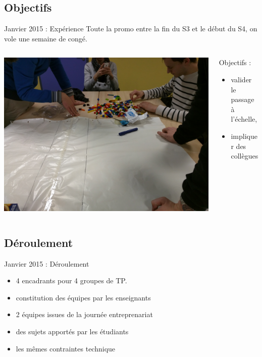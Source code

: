 \documentclass{beamer}
\begin{document}
\subsection{Objectifs}
\begin{frame}{Janvier 2015 : Expérience}
  Toute la promo entre la fin du S3 et le début du S4, on vole une semaine de congé.
  \begin{columns}
    \begin{column}{0.5\textwidth}
      \begin{center}
        \includegraphics[width=\textwidth]{includes/201501_lego.jpg}      
      \end{center}
    \end{column}
    \begin{column}{0.5\textwidth}
      Objectifs : 
      \begin{itemize}
        \item valider le passage à l'échelle, 
        \item impliquer des collègues
      \end{itemize}
    \end{column}
  \end{columns}
\end{frame}

\subsection{Déroulement}
\begin{frame}{Janvier 2015 : Déroulement}
  \begin{itemize}
    \item 4 encadrants pour 4 groupes de TP.
    \item constitution des équipes par les enseignants
    \item 2 équipes issues de la journée entreprenariat
    \item des sujets apportés par les étudiants
    \item les mêmes contraintes technique
  \end{itemize}
\end{frame}
\end{document}
